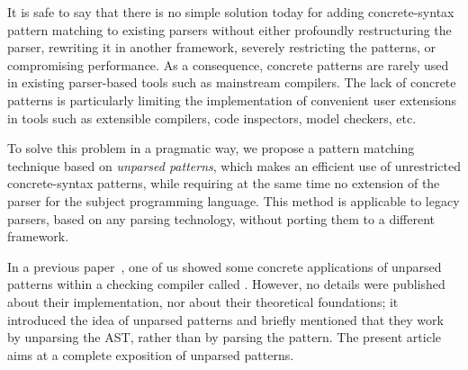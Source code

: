 It is safe to say that there is no simple solution today for adding
concrete\hyp{}syntax pattern matching to existing parsers without
either profoundly restructuring the parser, rewriting it in another
framework, severely restricting the patterns, or compromising
performance. As a consequence, concrete patterns are rarely used in
existing parser\hyp{}based tools such as mainstream compilers. The
lack of concrete patterns is particularly limiting the implementation
of convenient user extensions in tools such as extensible compilers,
code inspectors, model checkers, etc.

To solve this problem in a pragmatic way, we propose a pattern
matching technique based on \emph{unparsed patterns}, which makes an
efficient use of unrestricted concrete\hyp{}syntax patterns, while
requiring at the same time no extension of the parser for the subject
programming language. This method is applicable to legacy parsers,
based on any parsing technology, without porting them to a different
framework.

In a previous paper~\cite{ppdp}, one of us showed some concrete
applications of unparsed patterns within a checking compiler called
\MyGCC. However, no details were published about their implementation,
nor about their theoretical foundations; it introduced the idea of
unparsed patterns and briefly mentioned that they work by unparsing
the AST, rather than by parsing the pattern. The present article aims
at a complete exposition of unparsed patterns.


  

